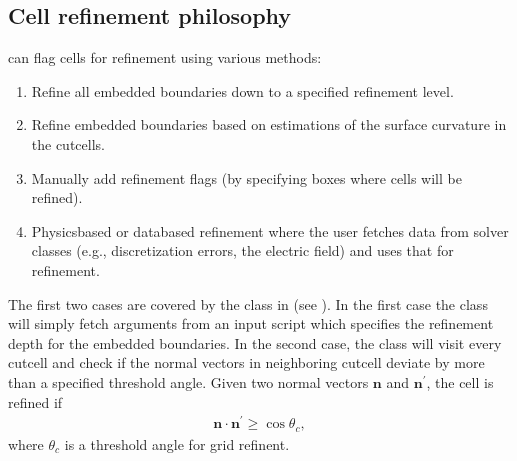 \documentclass[letterpaper,10pt,english]{sphinxmanual}
\begin{document}
\subsection{Cell refinement philosophy}
\label{\detokenize{Source/SpatialDiscretization:cell-refinement-philosophy}}\label{\detokenize{Source/SpatialDiscretization:chap-refinementphilosophy}}
 can flag cells for refinement using various methods:
\begin{enumerate}
%
\item {} 
Refine all embedded boundaries down to a specified refinement level.

\item {} 
Refine embedded boundaries based on estimations of the surface curvature in the cut\sphinxhyphen{}cells.

\item {} 
Manually add refinement flags (by specifying boxes where cells will be refined).

\item {} 
Physics\sphinxhyphen{}based or data\sphinxhyphen{}based refinement where the user fetches data from solver classes (e.g., discretization errors, the electric field) and uses that for refinement.

\end{enumerate}

The first two cases are covered by the  class in  (see {\hyperref[\detokenize{Source/Driver:chap-driver}]{}}).
In the first case the  class will simply fetch arguments from an input script which specifies the refinement depth for the embedded boundaries.
In the second case, the  class will visit every cut\sphinxhyphen{}cell and check if the normal vectors in neighboring cut\sphinxhyphen{}cell deviate by more than a specified threshold angle.
Given two normal vectors \(\mathbf{n}\) and \(\mathbf{n}^\prime\), the cell is refined if
\begin{equation*}
\begin{split}\mathbf{n}\cdot\mathbf{n}^\prime \geq \cos\theta_c,\end{split}
\end{equation*}
where \(\theta_c\) is a threshold angle for grid refinent.
\end{document}
